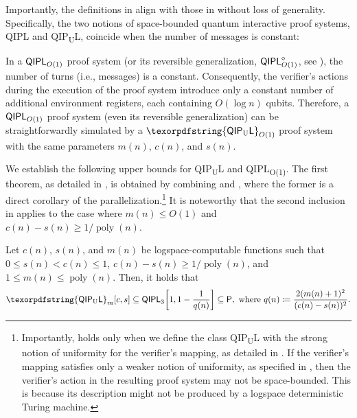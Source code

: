\documentclass[11pt, a4paper]{article}
\numberwithin{equation}{section}
\numberwithin{figure}{section}
\newcommand{\Ptime}{\textnormal{\textsf{P}}\xspace}
\newcommand{\QIPL}{\textnormal{\textsf{QIPL}}\xspace}
\newcommand{\QIPLconst}{\texorpdfstring{\textnormal{\textsf{QIPL}\textsubscript{O(1)}}}\xspace}
\newcommand{\QIPUL}{\texorpdfstring{\textnormal{\textsf{QIP}\textsubscript{\textnormal{U}}\textsf{L}}}\xspace}
\DeclarePairedDelimiter\sbra{\lbrack}{\rbrack}
\DeclareMathOperator\poly{poly}
\begin{document}
Importantly, the definitions in  align with those in  without loss of generality. Specifically, the two notions of space-bounded quantum interactive proof systems, \QIPL{} and \QIPUL{}, coincide when the number of messages is constant:
\begin{remark}[The equivalence of $\QIPL_{O(1)}$ and $\QIPUL_{O(1)}$]
    \label{remark:QIPLconst-welldefined}
    In a $\QIPL_{O(1)}$ proof system (or its reversible generalization, $\QIPL^{\diamond}_{O(1)}$, see ), the number of turns (i.e., messages) is a constant. Consequently, the verifier's actions during the execution of the proof system introduce only a constant number of additional environment registers, each containing $O(\log{n})$ qubits. Therefore, a $\QIPL_{O(1)}$ proof system (even its reversible generalization) can be straightforwardly simulated by a $\QIPUL_{O(1)}$ proof system with the same parameters $m(n)$, $c(n)$, and $s(n)$. 
\end{remark}

\vspace{1em}
We establish the following upper bounds for \QIPUL{} and \QIPLconst{}. 
The first theorem, as detailed in , is obtained by combining  and , where the former is a direct corollary of the parallelization.\footnote{Importantly,  holds only when we define the class \QIPUL{} with the strong notion of uniformity for the verifier's mapping, as detailed in . If the verifier's mapping satisfies only a weaker notion of uniformity, as specified in , then the verifier's action in the resulting proof system may not be space-bounded. This is because its description might not be produced by a logspace deterministic Turing machine.\label{footref:QIPL-uniformity-in-parallelization}} It is noteworthy that the second inclusion in  applies to the case where $m(n) \leq O(1)$ and $c(n) - s(n) \geq 1/\poly(n)$. 

\begin{theorem}[$\QIPUL \subseteq \Ptime$]
    \label{thm:QIPUL-in-P}
    Let $c(n)$, $s(n)$, and $m(n)$ be logspace-computable functions such that $0 \leq s(n) < c(n) \leq 1$, $c(n) \!-\! s(n) \geq 1/\poly(n)$, and $1 \leq m(n) \leq \poly(n)$. Then, it holds that
    \[ \QIPUL_m[c,s] \subseteq \QIPL_3\sbra*{1,1-\frac{1}{q(n)}} \subseteq \Ptime, \text{ where } q(n) \coloneqq \frac{2(m(n)+1)^2}{(c(n) - s(n))^2}. \]
\end{theorem}
\end{document}
